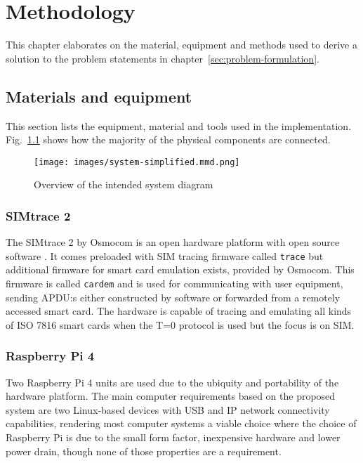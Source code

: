 \chapter{Methodology}

This chapter elaborates on the material, equipment and methods used
to derive a solution to the problem statements in
chapter~\ref{sec:problem-formulation}.

\section{Materials and equipment}
\label{sec:materials-and-equipment}

This section lists the equipment, material and tools used in the
implementation. Fig.~\ref{fig:simplified-system-diagram} shows how
the majority of the physical components are connected.

\begin{figure}[ht]
	\centering
	\texttt{[image: images/system-simplified.mmd.png]}
	\caption{Overview of the intended system diagram}
	\label{fig:simplified-system-diagram}
\end{figure}

\subsection{SIMtrace 2}

The SIMtrace 2 by Osmocom is an open hardware platform with open
source software \cite{simtrace}. It comes preloaded with SIM
tracing firmware called \verb|trace| \cite{simtrace-wiki} but
additional firmware for smart card emulation exists, provided by
Osmocom. This firmware is called \verb|cardem| \cite{simtrace-wiki}
and is used for communicating with user equipment, sending APDU:s
either constructed by software or forwarded from a remotely
accessed smart card. The hardware is capable of tracing and
emulating all kinds of ISO 7816 \cite{etsi-ts-102-221} smart cards
when the T=0 protocol is used \cite{simtrace-wiki} but the focus is
on SIM.

\subsection{Raspberry Pi 4}

Two Raspberry Pi 4 units are used due to the ubiquity and
portability of the hardware platform. The main computer
requirements based on the proposed system are two Linux-based
devices with USB and IP network connectivity capabilities,
rendering most computer systems a viable choice where the choice of
Raspberry Pi is due to the small form factor, inexpensive hardware
and lower power drain, though none of those properties are a
requirement.

